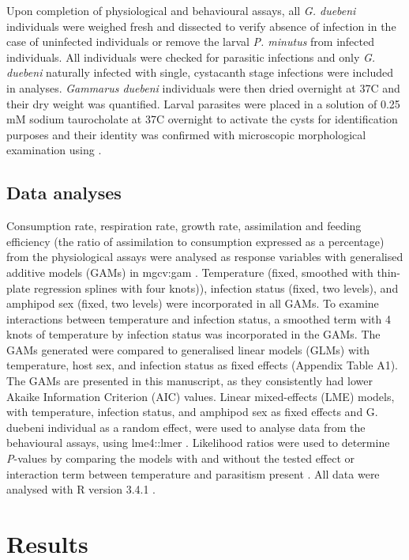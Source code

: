 Upon completion of physiological and behavioural assays, all \emph{G. duebeni} individuals were weighed fresh and dissected to verify absence of infection in the case of uninfected individuals or remove the larval \emph{P. minutus} from infected individuals. All individuals were checked for parasitic infections and only \emph{G. duebeni} naturally infected with single, cystacanth stage infections were included in analyses. \emph{Gammarus duebeni} individuals were then dried overnight at 37\degree C and their dry weight was quantified. Larval parasites were placed in a solution of 0.25 mM sodium taurocholate at 37\degree C overnight to activate the cysts for identification purposes \citep{horvath1969} and their identity was confirmed with microscopic morphological examination using \citet{mcdonald1988}. 

\subsection{Data analyses}

Consumption rate, respiration rate, growth rate, assimilation and feeding efficiency (the ratio of assimilation to consumption expressed as a percentage) from the physiological assays were analysed as response variables with generalised additive models (GAMs) in mgcv:gam \citep{wood2016}.  Temperature (fixed, smoothed with thin-plate regression splines with four knots)), infection status (fixed, two levels), and amphipod sex (fixed, two levels) were incorporated in all GAMs. To examine interactions between temperature and infection status, a smoothed term with 4 knots of temperature by infection status was incorporated in the GAMs. The GAMs generated were compared to generalised linear models (GLMs) with temperature, host sex, and infection status as fixed effects (Appendix Table A1). The GAMs are presented in this manuscript, as they consistently had lower Akaike Information Criterion (AIC) values. 
Linear mixed-effects (LME) models, with temperature, infection status, and amphipod sex as fixed effects and G. duebeni individual as a random effect, were used to analyse data from the behavioural assays, using lme4::lmer \citep{bates2015}. Likelihood ratios were used to determine \emph{P}-values by comparing the models with and without the tested effect or interaction term between temperature and parasitism present \citep{crawley2012}. All data were analysed with R version 3.4.1 \citep{r2017}.

\section{Results}

